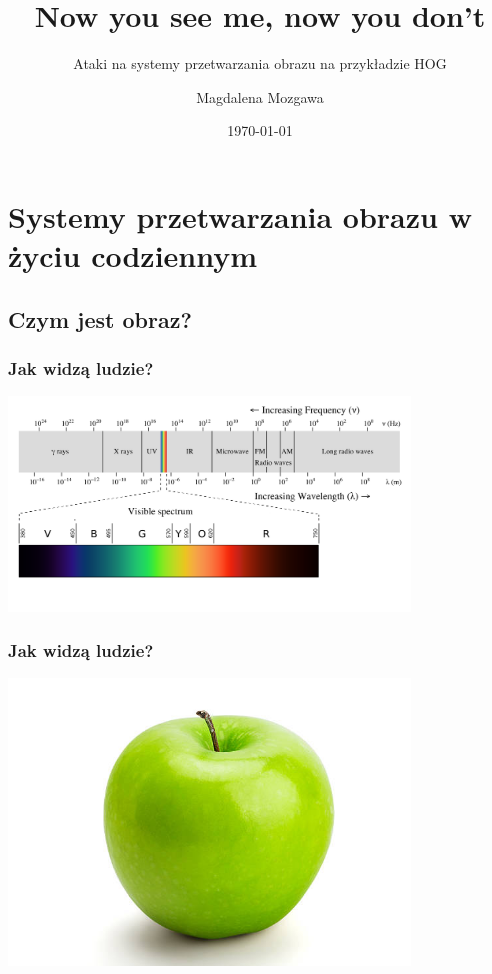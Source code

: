 \documentclass{beamer}
\title{Now you see me, now you don't}
\subtitle{Ataki na systemy przetwarzania obrazu na przykładzie HOG}
\author{Magdalena Mozgawa}
\institute{WMI UAM}
\date{\today}
\begin{document}
    \begin{frame}
        \titlepage
    \end{frame}


    \section{Systemy przetwarzania obrazu w życiu codziennym}

        \subsection{Czym jest obraz?}
            \begin{frame}
                \begin{center}
                    \frametitle{Jak widzą ludzie?}
                    \includegraphics[width=0.8\textwidth]{pictures/wavelength.png}
                \end{center}
            \end{frame}

            \begin{frame}
                \begin{center}
                    \frametitle{Jak widzą ludzie?}
                    \includegraphics[width=0.8\textwidth]{pictures/apple.jpg}
                \end{center}
            \end{frame}
\end{document}
